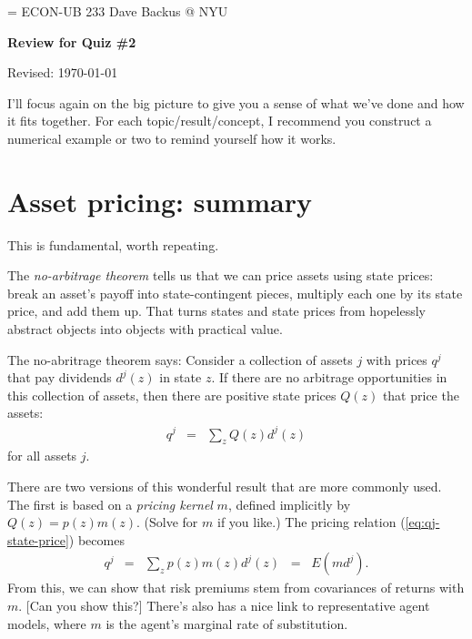 \documentclass[11pt]{article}
\begin{document}
\parskip=\bigskipamount
\parindent=0.0in
\thispagestyle{empty}
{\large ECON-UB 233 \hfill Dave Backus @ NYU}

\bigskip\bigskip
\centerline{\Large \bf Review for Quiz \#2}
\centerline{Revised: \today}

\bigskip
I'll focus again on the big picture to give you a sense of
what we've done and how it fits together.
For each topic/result/concept, I recommend you construct a numerical example or two to
remind yourself how it works.


\section{Asset pricing:  summary}

This is fundamental, worth repeating.

The {\it no-arbitrage theorem\/} tells us that we can price
assets using state prices:
break an asset's payoff into state-contingent pieces,
multiply each one by its state price, and add them up.
That turns states and state prices from hopelessly abstract objects
into objects with practical value.

The no-abritrage theorem says:
Consider a collection of assets $j$ with prices $q^j$ that pay dividends $d^j(z)$
in state $z$.
If there are no arbitrage opportunities in this collection of assets,
then there are positive state prices $Q(z)$ that price the assets:
\begin{eqnarray}
    q^j &=& \sum_z Q(z) d^j(z)
    \label{eq:qj-state-price}
\end{eqnarray}
for all assets $j$.

There are two versions of this wonderful result that are more commonly used.
The first is based on a {\it pricing kernel\/} $m$,
defined implicitly by $ Q(z) = p(z) m(z)$.
(Solve for $m$ if you like.)
The pricing relation (\ref{eq:qj-state-price}) becomes
\begin{eqnarray}
    q^j &=& \sum_z p(z) m(z) d^j(z) \;\;=\;\; E (m d^j) .
    \label{eq:q=Emd}
\end{eqnarray}
From this, we can show that risk premiums stem from covariances of returns with $m$.
[Can you show this?]
There's also has a nice link to representative agent models,
where $m$ is the agent's marginal rate of substitution.
\end{document}
